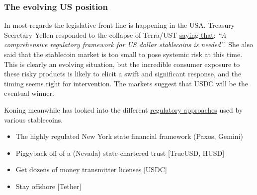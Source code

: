 \subsubsection{The evolving US position}
In most regards the legislative front line is happening in the USA. Treasury Secretary Yellen responded to the collapse of Terra/UST \href{https://www.youtube.com/watch?v=kU0xYBRfgvU}{saying that}: \textit{``A comprehensive regulatory framework for US dollar stablecoins is needed''}. She also said that the stablecoin market is too small to pose systemic risk at this time. This is clearly an evolving situation, but the incredible consumer exposure to these risky products is likely to elicit a swift and significant response, and the timing seems right for intervention. The markets suggest that USDC will be the eventual winner.\par Koning meanwhile has looked into the different \href{http://jpkoning.blogspot.com/2021/08/stablecoin-regulatory-strategies.html}{regulatory approaches} used by various stablecoins.\par
\begin{itemize}
\item The highly regulated New York state financial framework (Paxos, Gemini)
\item Piggyback off of a (Nevada) state-chartered trust [TrueUSD, HUSD]
\item Get dozens of money transmitter licenses [USDC]
\item Stay offshore [Tether]
\end{itemize}

